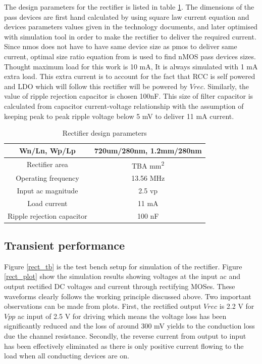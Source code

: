 \documentclass[12pt,a4paper,UKenglish]{article}
\begin{document}
The design parameters for the rectifier is listed in table  \ref{tab:rect_parameter}. The dimensions of the pass devices are first hand calculated by using square law current equation and devices parameters values given in the technology documents, and later optimised with simulation tool in order to make the rectifier to deliver the required current. Since \acrshort{nmos} does not have to have same device size as \acrshort{pmos} to deliver same current, optimal size ratio equation from \cite{rectsize} is used to find nMOS pass devices sizes. Thought maximum load for this work is 10 mA, It is always simulated with 1 mA extra load. This extra current is to account for the fact that RCC is self powered and LDO which will follow this rectifier will be powered by $Vrec$. Similarly, the value of ripple rejection capacitor is chosen 100nF. This size of 
filter capacitor is calculated from capacitor current-voltage relationship with the assumption of keeping peak to peak ripple voltage below 5 mV to deliver 11 mA current.  \\

\begin{table}[H]
\caption{Rectifier design parameters}
\begin{center}
\begin{tabular}{c|c}
\hline \hline
Wn/Ln, Wp/Lp 		& 720um/280nm, 1.2mm/280nm \\ \hline
Rectifier area 		& TBA mm\textsuperscript{2} \\ \hline
Operating frequency 	& 13.56 MHz \\ \hline
Input ac magnitude	& 2.5  \acrshort{vp}\\ \hline
Load current 		& 11 mA \\ \hline
Ripple rejection capacitor	& 100 nF \\ 
\hline \hline
\end{tabular}
\end{center}
\label{tab:rect_parameter}
\end{table}

\subsection{Transient performance}

Figure \ref{rect_tb} is the test bench setup for simulation of the rectifier. Figure \ref{rect_plot} show the simulation results showing voltages at the input ac and output rectified DC 
voltages and current through rectifying MOSes. These  
waveforms clearly follows the working principle discussed above. Two important observations can be made from 
plots. First, the rectified output $Vrec$ is 2.2 V for $Vpp$ ac input of 2.5 V for driving which means the 
voltage loss has been significantly reduced and the loss of around 300 mV yields to the conduction loss due 
the channel resistance. Secondly, the reverse current from output to input has been effectively eliminated as 
there is only positive current flowing to the load when all conducting devices 
are on.  \\
\end{document}
